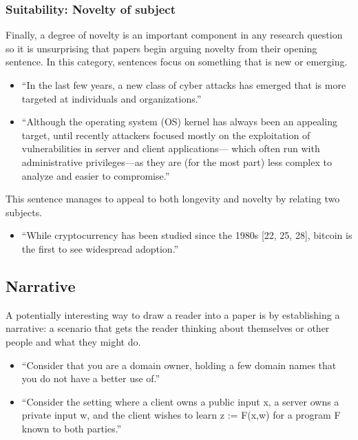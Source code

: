 \documentclass[sigconf]{acmart}
\begin{document}
	\subsubsection{Suitability: Novelty of subject}

	Finally, a degree of novelty is an important component in any research question so it is unsurprising that papers begin arguing novelty from their opening sentence. In this category, sentences focus on something that is new or emerging.
	\begin{itemize}
		\item 	``In the last few years, a new class of cyber attacks has emerged that is more targeted at individuals and organizations.''~\cite{le2014look}

		\item  ``Although the operating system (OS) kernel has always been an appealing target, until recently attackers focused mostly on the exploitation of vulnerabilities in server and client applications— which often run with administrative privileges—as they are (for the most part) less complex to analyze and easier to compromise.''~\cite{kemerlis2014ret2dir}
	\end{itemize}

	This sentence manages to appeal to both longevity and novelty by relating two subjects.
	\begin{itemize}

		\item  ``While cryptocurrency has been studied since the 1980s [22, 25, 28], bitcoin is the first to see widespread adoption.''~\cite{heilman2015eclipse}

	\end{itemize}

	\subsection{Narrative}

	A potentially interesting way to draw a reader into a paper is by establishing a narrative: a scenario that gets the reader thinking about themselves or other people and what they might do.
	\begin{itemize}
		\item 	``Consider that you are a domain owner, holding a few domain names that you do not have a better use of.''~\cite{alrwais2014understanding}

		\item 	``Consider the setting where a client owns a public input x, a server owns a private input w, and the client wishes to learn z := F(x,w) for a program F known to both parties.''~\cite{ben2014succinct}
	\end{itemize}
\end{document}
